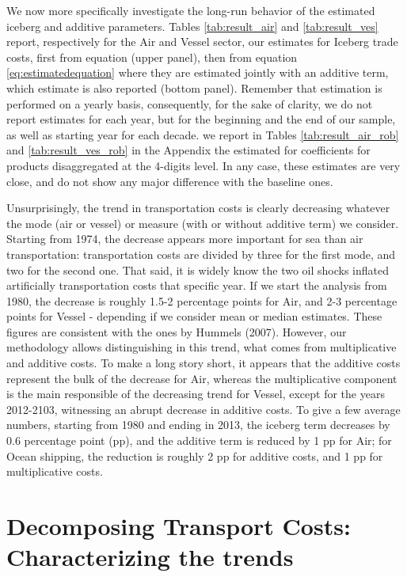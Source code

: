 \documentclass[a4paper,11pt]{article}
\begin{document}
We now more specifically investigate the long-run behavior of the estimated iceberg and additive parameters. Tables \ref{tab:result_air} and \ref{tab:result_ves} report, respectively for the Air and Vessel sector, our estimates for Iceberg trade costs, first from equation \label{eq:iceberg} (upper panel), then from equation \ref{eq:estimatedequation} where they are estimated jointly with an additive term, which estimate is also reported (bottom panel). Remember that estimation is performed on a yearly basis, consequently, for the sake of clarity, we do not report estimates for each year, but for the beginning and the end of our sample, as well as starting year for each decade. we report in Tables \ref{tab:result_air_rob} and \ref{tab:result_ves_rob} in the Appendix the estimated for coefficients for products disaggregated at the 4-digits level. In any case, these estimates are very close, and do not show any major difference with the baseline ones.

Unsurprisingly, the trend in transportation costs is clearly decreasing whatever the mode (air or vessel) or measure (with or without additive term) we consider. Starting from 1974, the decrease appears more important for sea than air transportation: transportation costs are divided by three for the first mode, and two for the second one. That said, it is widely know the two oil shocks inflated artificially transportation costs that specific year. If we start the analysis from 1980, the decrease is roughly 1.5-2 percentage points for Air, and 2-3 percentage points for Vessel - depending if we consider mean or median estimates. These figures are consistent with the ones by Hummels (2007). However, our methodology allows distinguishing in this trend, what comes from multiplicative and additive costs. To make a long story short, it appears that the additive costs represent the bulk of the decrease for Air, whereas the multiplicative component is the main responsible of the decreasing trend for Vessel, except for the years 2012-2103, witnessing an abrupt decrease in additive costs. To give a few average numbers, starting from 1980 and ending in 2013, the iceberg term decreases by 0.6 percentage point (pp), and the additive term is reduced by 1 pp for Air; for Ocean shipping, the reduction is roughly 2 pp for additive costs, and 1 pp for multiplicative costs.


\section{Decomposing Transport Costs: Characterizing the trends \label{sec:results_trends}}
\end{document}
